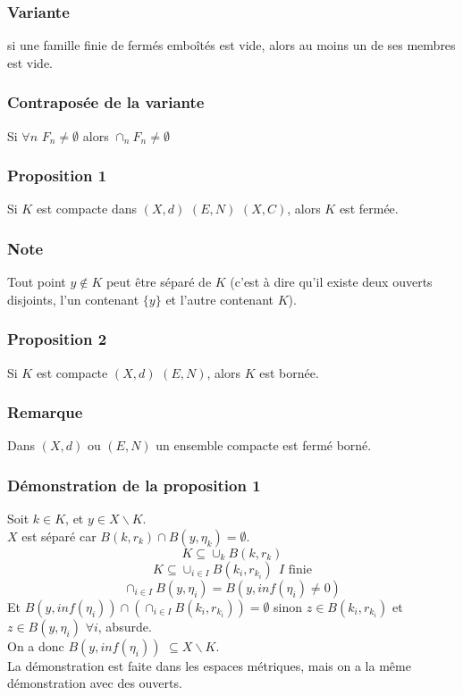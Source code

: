 \documentclass[a4paper, oneside]{report}
\begin{document}
\subsubsection{Variante}
si une famille finie de fermés emboîtés est vide, alors au moins un de ses membres est vide.

\subsubsection{Contraposée de la variante}
Si $\forall n$ $F_n\neq \emptyset$ alors $\cap_n F_n \neq \emptyset$

\subsubsection{Proposition 1}
Si $K$ est compacte dans $(X,d)$ $(E,N)$ $(X,C)$, alors $K$ est fermée.

\subsubsection{Note}
Tout point $y \notin K$ peut être séparé de $K$ (c'est à dire qu'il existe deux ouverts disjoints, l'un contenant $\{y\}$ et l'autre contenant $K$).

\subsubsection{Proposition 2}
Si $K$ est compacte $(X,d)$ $(E,N)$, alors $K$ est bornée.

\subsubsection{Remarque}
Dans $(X,d)$ ou $(E,N)$ un ensemble compacte est fermé borné.\\

\subsubsection{Démonstration de la proposition 1}
Soit $k\in K$, et $y\in X\backslash K$.\\
$X$ est séparé car $B(k,r_k)\cap B(y,\eta_k)=\emptyset$.\\
$$K\subseteq \cup_k B(k,r_k)$$
$$K\subseteq \cup_{i\in I} B(k_i,r_{k_i}) ~~I\text{ finie}$$
$$\cap_{i\in I} B(y,\eta_i)=B(y,inf(\eta_i)\neq 0)$$
Et $B(y,inf(\eta_i))\cap (\cap_{i\in I} B(k_i,r_{k_i})) = \emptyset$ sinon $z\in B(k_i,r_{k_i})$ et $z\in B(y,\eta_i)$ $\forall i$, absurde.\\
On a donc $B(y,inf(\eta_i))$ $\subseteq X\backslash K$.\\
La démonstration est faite dans les espaces métriques, mais on a la même démonstration avec des ouverts.
\end{document}
